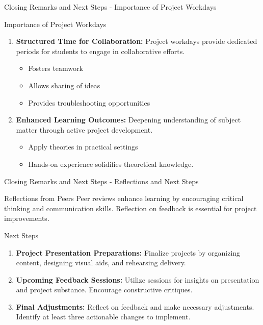 \documentclass[aspectratio=169]{beamer}
\begin{document}
\begin{frame}[fragile]{Closing Remarks and Next Steps - Importance of Project Workdays}
    \begin{block}{Importance of Project Workdays}
        \begin{enumerate}
            \item \textbf{Structured Time for Collaboration:}
            Project workdays provide dedicated periods for students to engage in collaborative efforts.
            \begin{itemize}
                \item Fosters teamwork
                \item Allows sharing of ideas
                \item Provides troubleshooting opportunities
                \end{itemize}
            \item \textbf{Enhanced Learning Outcomes:}
            Deepening understanding of subject matter through active project development.
            \begin{itemize}
                \item Apply theories in practical settings
                \item Hands-on experience solidifies theoretical knowledge.
            \end{itemize}
        \end{enumerate}
    \end{block}
\end{frame}

\begin{frame}[fragile]{Closing Remarks and Next Steps - Reflections and Next Steps}
    \begin{block}{Reflections from Peers}
        Peer reviews enhance learning by encouraging critical thinking and communication skills.
        Reflection on feedback is essential for project improvements.
    \end{block}
    
    \begin{block}{Next Steps}
        \begin{enumerate}
            \item \textbf{Project Presentation Preparations:}
            Finalize projects by organizing content, designing visual aids, and rehearsing delivery.
            \item \textbf{Upcoming Feedback Sessions:}
            Utilize sessions for insights on presentation and project substance. Encourage constructive critiques.
            \item \textbf{Final Adjustments:}
            Reflect on feedback and make necessary adjustments. Identify at least three actionable changes to implement.
        \end{enumerate}
    \end{block}
\end{frame}
\end{document}
